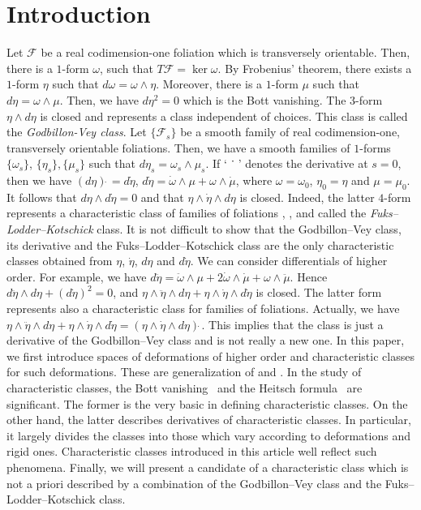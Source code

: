 \documentclass[12pt]{amsart}
\newcommand{\CF}{{\mathcal F}}
\theoremstyle{definition}
\theoremstyle{remark}
\begin{document}
\section*{Introduction}
Let $\CF$ be a real codimension-one foliation which is transversely orientable.
Then, there is a $1$-form $\omega$, such that $T\CF=\ker\omega$.
By Frobenius' theorem, there exists a $1$-form $\eta$ such that $d\omega=\omega\wedge\eta$.
Moreover, there is a $1$-form $\mu$ such that $d\eta=\omega\wedge\mu$.
Then, we have $d\eta^2=0$ which is the Bott vanishing.
The $3$-form $\eta\wedge d\eta$ is closed and represents a class independent of choices.
This class is called the \textit{Godbillon-Vey class}.
Let $\{\CF_s\}$ be a smooth family of real codimension-one, transversely orientable foliations.
Then, we have a smooth families of $1$-forms $\{\omega_s\}$, $\{\eta_s\},\{\mu_s\}$ such that $d\eta_s=\omega_s\wedge\mu_s$.
If `$\dot{\hphantom{m}}$' denotes the derivative at $s=0$, then we have $(d\eta)\dot{\,}=d\dot{\eta}$, $d\dot{\eta}=\dot{\omega}\wedge\mu+\omega\wedge\dot{\mu}$, where $\omega=\omega_0$, $\eta_0=\eta$ and $\mu=\mu_0$.
It follows that $d\eta\wedge d\dot{\eta}=0$ and that $\eta\wedge\dot{\eta}\wedge d\eta$ is closed.
Indeed, the latter $4$-form represents a characteristic class of families of foliations \cite{Fuks}, \cite{Kotschick}, \cite{Lodder} and called the \textit{Fuks--Lodder--Kotschick} class.
It is not difficult to show that the Godbillon--Vey class, its derivative and the Fuks--Lodder--Kotschick class are the only characteristic classes obtained from $\eta$, $\dot\eta$, $d\eta$ and $d\dot\eta$.
We can consider differentials of higher order.
For example, we have $d\ddot{\eta}=\ddot{\omega}\wedge\mu+2\dot{\omega}\wedge\dot{\mu}+\omega\wedge\ddot{\mu}$.
Hence $d\ddot{\eta}\wedge d\eta+(d\dot{\eta})^2=0$, and $\eta\wedge\ddot{\eta}\wedge d\eta+\eta\wedge\dot{\eta}\wedge d\dot\eta$ is closed.
The latter form represents also a characteristic class for families of foliations.
Actually, we have $\eta\wedge\ddot{\eta}\wedge d\eta+\eta\wedge\dot{\eta}\wedge d\dot\eta=(\eta\wedge\dot{\eta}\wedge d\eta)\dot{\,}$.
This implies that the class is just a derivative of the Godbillon--Vey class and is not really a new one.
In this paper, we first introduce spaces of deformations of higher order and characteristic classes for such deformations.
These are generalization of \cite{12} and \cite{asuke:UT}.
In the study of characteristic classes, the Bott vanishing~\cite{Bott:LNM} and the Heitsch formula~\cite{Heitsch:Topology} are significant.
The former is the very basic in defining characteristic classes.
On the other hand, the latter describes derivatives of characteristic classes.
In particular, it largely divides the classes into those which vary according to deformations and rigid ones.
Characteristic classes introduced in this article well reflect such phenomena.
Finally, we will present a candidate of a characteristic class which is not a priori described by a combination of the Godbillon--Vey class and the Fuks--Lodder--Kotschick class.
\end{document}
